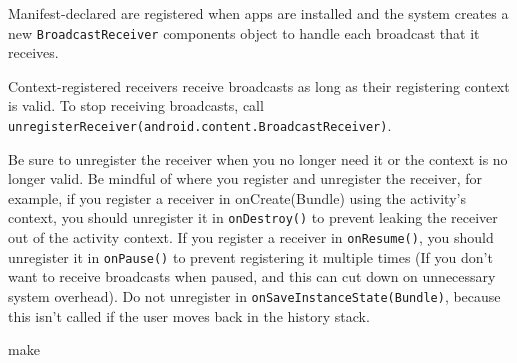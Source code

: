 Manifest-declared are registered when apps are installed and the system creates
a new \texttt{BroadcastReceiver} components object to handle each broadcast that
it receives.

Context-registered receivers receive broadcasts as long as their registering
context is valid. To stop receiving broadcasts, call
\texttt{unregisterReceiver(android.content.BroadcastReceiver)}.

Be sure to unregister the receiver when you no longer need it or the context is
no longer valid. Be mindful of where you register and unregister the receiver,
for example, if you register a receiver in onCreate(Bundle) using the activity's
context, you should unregister it in \texttt{onDestroy()} to prevent leaking the
receiver out of the activity context. If you register a receiver in
\texttt{onResume()}, you should unregister it in \texttt{onPause()} to prevent
registering it multiple times (If you don't want to receive broadcasts when
paused, and this can cut down on unnecessary system overhead). Do not unregister
in \texttt{onSaveInstanceState(Bundle)}, because this isn't called if the user
moves back in the history stack.

make





  


